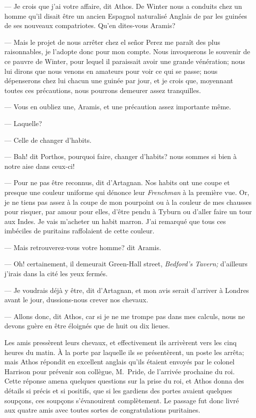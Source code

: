 — Je crois que j'ai votre affaire, dit Athos. De Winter nous a conduits chez un homme qu'il disait être un ancien Espagnol naturalisé Anglais de par les guinées de ses nouveaux compatriotes. Qu'en dites-vous Aramis?

— Mais le projet de nous arrêter chez el señor Perez me paraît des plus raisonnables, je l'adopte donc pour mon compte. Nous invoquerons le souvenir de ce pauvre de Winter, pour lequel il paraissait avoir une grande vénération; nous lui dirons que nous venons en amateurs pour voir ce qui se passe; nous dépenserons chez lui chacun une guinée par jour, et je crois que, moyennant toutes ces précautions, nous pourrons demeurer assez tranquilles.

— Vous en oubliez une, Aramis, et une précaution assez importante même.

— Laquelle?

— Celle de changer d'habits.

— Bah! dit Porthos, pourquoi faire, changer d'habits? nous sommes si bien à notre aise dans ceux-ci!

— Pour ne pas être reconnus, dit d'Artagnan. Nos habits ont une coupe et presque une couleur uniforme qui dénonce leur \textit{Frenchman} à la première vue. Or, je ne tiens pas assez à la coupe de mon pourpoint ou à la couleur de mes chausses pour risquer, par amour pour elles, d'être pendu à Tyburn ou d'aller faire un tour aux Indes. Je vais m'acheter un habit marron. J'ai remarqué que tous ces imbéciles de puritains raffolaient de cette couleur.

— Mais retrouverez-vous votre homme? dit Aramis.

— Oh! certainement, il demeurait Green-Hall street, \textit{Bedford's Tavern;} d'ailleurs j'irais dans la cité les yeux fermés. 

— Je voudrais déjà y être, dit d'Artagnan, et mon avis serait d'arriver à Londres avant le jour, dussions-nous crever nos chevaux.

— Allons donc, dit Athos, car si je ne me trompe pas dans mes calculs, nous ne devons guère en être éloignés que de huit ou dix lieues.

Les amis pressèrent leurs chevaux, et effectivement ils arrivèrent vers les cinq heures du matin. À la porte par laquelle ils se présentèrent, un poste les arrêta; mais Athos répondit en excellent anglais qu'ils étaient envoyés par le colonel Harrison pour prévenir son collègue, M.~Pride, de l'arrivée prochaine du roi. Cette réponse amena quelques questions sur la prise du roi, et Athos donna des détails si précis et si positifs, que si les gardiens des portes avaient quelques soupçons, ces soupçons s'évanouirent complètement. Le passage fut donc livré aux quatre amis avec toutes sortes de congratulations puritaines.

